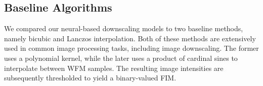 \subsection{Baseline Algorithms} 

We compared our neural-based downscaling models to two baseline methods, namely bicubic and Lanczos interpolation. Both of these methods are extensively used in common image processing tasks, including image downscaling. The former uses a polynomial kernel, while the later uses a product of cardinal sines to interpolate between \ac{WFM} samples. The resulting image intensities are subsequently thresholded to yield a binary-valued \ac{FIM}. 


